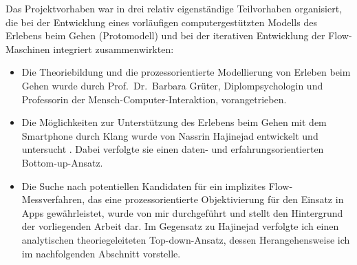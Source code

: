 Das Projektvorhaben war in drei relativ eigenständige Teilvorhaben organisiert, die bei der Entwicklung eines vorläufigen computergestützten Modells des Erlebens beim Gehen (Protomodell) und bei der iterativen Entwicklung der Flow-Maschinen integriert zusammenwirkten: 
\begin{itemize}
	
	\item Die Theoriebildung und die prozessorientierte Modellierung von Erleben beim Gehen wurde durch Prof.\  Dr.\ Barbara Grüter, Diplompsychologin und Professorin der Mensch-Computer-Interaktion, vorangetrieben.
	
	\item Die Möglichkeiten zur Unterstützung des Erlebens beim Gehen mit dem Smartphone durch Klang wurde von Nassrin Hajinejad entwickelt und untersucht \citep{Hajinejad2013, Hajinejad2015}. Dabei verfolgte sie einen daten- und erfahrungsorientierten Bottom-up-Ansatz.
	
	\item Die Suche nach potentiellen Kandidaten für ein implizites Flow-Messverfahren, das eine prozessorientierte Objektivierung für den Einsatz in Apps gewährleistet, wurde von mir durchgeführt und stellt den Hintergrund der vorliegenden Arbeit dar. Im Gegensatz zu Hajinejad verfolgte ich einen analytischen theoriegeleiteten Top-down-Ansatz, dessen Herangehensweise ich im nachfolgenden Abschnitt vorstelle. 
\end{itemize}

